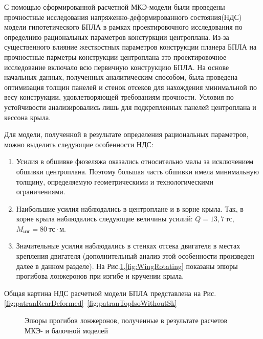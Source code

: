 \label{sec:ndsResults}

С помощью сформированной расчетной МКЭ-модели были проведены прочностные исследования напряженно-деформированного состояния(НДС) модели гипотетического БПЛА в рамках проектировочного исследования по определнию рациональных параметров констуркции центроплана. Из-за существенного влияние жесткостных параметров конструкции планера БПЛА на прочностные парметры конструкции центроплана это проектировочное исследование включало всю первичную конструкцию БПЛА. На основе начальных данных, полученных аналитическим способом, была проведена оптимизация толщин панелей и стенок отсеков для нахождения минимальной по весу конструкции, удовлетворяющей требованиям прочности. Условия по устойчивости анализировались лишь для подкрепленных панелей центроплана и кессона крыла.

Для модели, полученной в результате определения рациональных параметров, можно выделить следующие особенности НДС:

\begin{enumerate}
\item Усилия в обшивке фюзеляжа оказались относительно малы за исключением обшивки центроплана. Поэтому большая часть обшивки имела минимальную толщину, определяемую геометрическими и технологическими ограничениями.
\item Наибольшие усилия наблюдались в центроплане и в корне крыла. Так, в корне крыла наблюдались следующие величины усилий: $Q = 13,7~\text{тс}$, $M_\text{изг} = 80~\text{тс}\cdot\text{м}$. 
\item Значительные усилия наблюдались в стенках отсека двигателя в местах крепления двигателя (дополнительный анализ этой особенности произведен далее в данном разделе). На Рис.\ref{fig:WingDeformation3},\ref{fig:WingRotating} показаны эпюры прогибова лонжеронов при изгибе и кручении крыла.
\end{enumerate}  

Общая картина НДС расчетной модели БПЛА представлена на Рис.\ref{fig:patranRearDeformed}--\ref{fig:patranTopIsoWithoutSk}


\begin{figure}[H]
\centering

\captionsetup{justification=centering}
\def\svgwidth{0.9\textwidth}

\caption{Эпюры прогибов лонжеронов, полученные в результате расчетов МКЭ- и балочной моделей}
\label{fig:WingDeformation3}
\end{figure}

